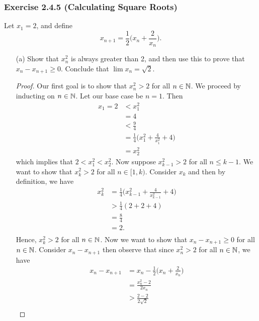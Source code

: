 \subsubsection{Exercise 2.4.5 (Calculating Square Roots)}
Let \(x_1 = 2\), and define 
\[
    x_{n+1} = \frac{1}{2} \Big( x_n + \frac{2}{x_n}\Big).
\]

\begin{enumerate}
    \item[(a)] Show that \( x_n^2\) is always greater than 2, and then use this to prove that \( x_n - x_{n+1} \geq 0\). Conclude that \( \lim x_n = \sqrt{2} \).
        \begin{proof}
         Our first goal is to show that \( x_n^2 > 2 \) for all \( n \in \mathbb{N} \). We proceed by inducting on \( n \in \mathbb{N}\). Let our base case be \( n = 1\). Then 
         \begin{align*}
         x_1 = 2 &< x_1^2   \\
                 &= 4 \\ 
                 &< \frac{9}{4} \\
                 &= \frac{1}{4} \Big( x_1^2 + \frac{4}{x_1^2} + 4 \Big) \\
                 &= x_2^2
         \end{align*}
         which implies that \( 2 < x_1^2 < x_2^2\). Now suppose \( x_{k-1}^2 > 2\) for all \( n \leq k - 1\). We want to show that \( x_k^2 > 2 \) for all \( n \in [1, k)\). Consider \( x_k \) and then by definition, we have 
         \begin{align*}
             x_{k}^2 &= \frac{1}{4} \Big( x_{k-1}^2 + \frac{4}{x_{k-1}^2} + 4 \Big) \\
                   &> \frac{1}{4} (2 + 2 + 4) \\ 
                   &= \frac{8}{4} \\
                   &= 2.\\
        \end{align*}
        Hence, \( x_k^2 > 2\) for all \( n \in \mathbb{N}\).  Now we want to show that \( x_n - x_{n+1} \geq 0  \) for all \( n \in \mathbb{N} \). Consider \( x_n - x_{n+1}\) then observe that since \( x_n^2 > 2 \) for all \( n \in \mathbb{N} \), we have 
        \begin{align*}
            x_n - x_{n+1}&= x_n - \frac{1}{2} \Big( x_n + \frac{2}{x_n}\Big) \\ 
                        &= \frac{x_n^2 - 2 }{2x_n} \\
                        &> \frac{2 - 2 }{2 \sqrt{2}} \\

\end{align*}
\end{proof}
\end{enumerate}
